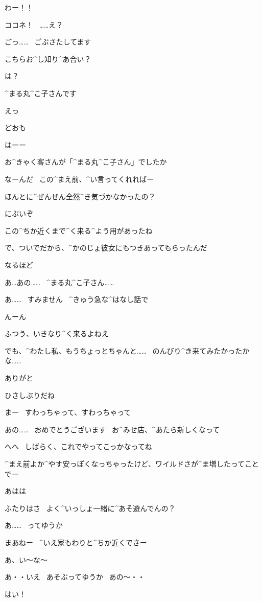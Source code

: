 \A わー！！

\A ココネ！
\ ……え？

\K ごっ……
\ ごぶさたしてます

\A こちらお^{し}{知}り^{あ}{合}い？

\K は？

\K ^{まる}{丸}^{こ}{子}さんです

\A えっ

\page
\R どおも

\A はーー

\A お^{きゃく}{客}さんが「^{まる}{丸}^{こ}{子}さん」でしたか

\A なーんだ
\ この^{まえ}{前}、^{い}{言}ってくれればー

\R ほんとに^{ぜんぜん}{全然}^{き}{気}づかなかったの？

\R にぶいぞ

\page
\R この^{ちか}{近}くまで^{く}{来}る^{よう}{用}があったね

\R で、ついでだから、^{かのじょ}{彼女}にもつきあってもらったんだ

\A なるほど

\K あ…あの……
\ ^{まる}{丸}^{こ}{子}さん……

\K あ……
\ すみません
\ ^{きゅう}{急}な^{はなし}{話}で

\A んーん

\page
\R ふつう、いきなり^{く}{来}るよねえ

\K でも、^{わたし}{私}、もうちょっとちゃんと……
\ のんびり^{き}{来}てみたかったかな……

\A ありがと

\A ひさしぶりだね

\A まー
\ すわっちゃって、すわっちゃって

\page
\K あの……
\ おめでとうございます
\ お^{みせ}{店}、^{あたら}{新}しくなって

\A へへ
\ しばらく、これでやってこっかなってね

\A ^{まえ}{前}よか^{やす}{安}っぽくなっちゃったけど、ワイルドさが^{ま}{増}したってことでー

\K あはは

\page
\A ふたりはさ
\ よく^{いっしょ}{一緒}に^{あそ}{遊}んでんの？

\K あ……
\ ってゆうか

\R まあねー
\ ^{いえ}{家}もわりと^{ちか}{近}くでさー

\A あ、い〜な〜

\R あ・・いえ
\ あそぶってゆうか
\ あの〜・・

\page
\A はい！

